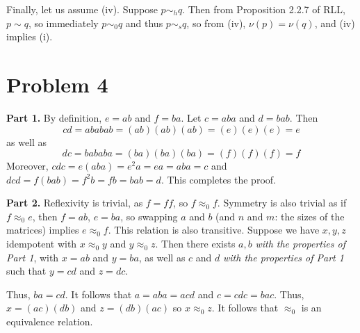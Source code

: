 \documentclass[aps,pra,showpacs,notitlepage,onecolumn,superscriptaddress,nofootinbib]{revtex4-1}
\newcommand{\hhrulefill}{\hspace{-1.0em}\hrulefill}
\theoremstyle{definition}
\begin{document}
\noindent Finally, let us assume (iv). Suppose $p \sim_h q$. Then from Proposition 2.2.7 of RLL, $p \sim q$, so immediately $p \sim_0 q$ and thus $p \sim_s q$, so from (iv), $\nu(p) = \nu(q)$, and (iv) implies (i).

\hhrulefill

\section{Problem 4}

\noindent \textbf{Part 1.} By definition, $e = ab$ and $f = ba$. Let $c = aba$ and $d = bab$. Then
\begin{equation}
  cd = ababab = (ab)(ab)(ab) = (e)(e)(e) = e
\end{equation}
as well as
\begin{equation}
  dc = bababa = (ba)(ba)(ba) = (f)(f)(f) = f
\end{equation}
Moreover, $cdc = e(aba) = e^2 a = ea = aba = c$ and $dcd = f(bab) = f^2 b = fb = bab = d$. This completes the proof.
\newline

\noindent \textbf{Part 2.} Reflexivity is trivial, as $f = ff$, so $f \approx_0 f$. Symmetry is also trivial as if $f \approx_0 e$, then $f = ab$, $e = ba$, so swapping $a$ and $b$ (and $n$ and $m$: the sizes of the matrices) implies $e \approx_0 f$.
This relation is also transitive. Suppose we have $x, y, z$ idempotent with $x \approx_0 y$ and $y \approx_0 z$. Then there exists $a, b$ \emph{with the properties of Part 1}, with $x = ab$ and $y = ba$, as well as $c$ and $d$ \emph{with the properties of Part 1} such that $y = cd$ and $z = dc$.

Thus, $ba = cd$. It follows that $a = aba = acd$ and $c = cdc = bac$. Thus, $x = (ac)(db)$ and $z = (db)(ac)$ so $x \approx_0 z$. It follows that $\approx_0$ is an equivalence relation.
\newline
\end{document}
